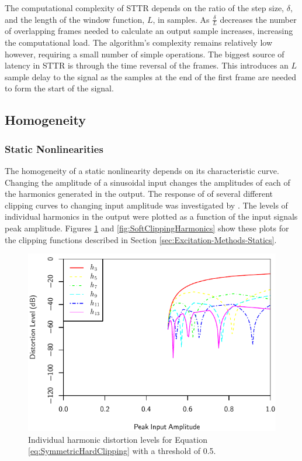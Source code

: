 		The computational complexity of STTR depends on the ratio of the step size, $\delta$, and the length of the
		window function, $L$, in samples. As $\frac{\delta}{L}$ decreases the number of overlapping frames needed
		to calculate an output sample increases, increasing the computational load. The algorithm's complexity
		remains relatively low however, requiring a small number of simple operations. The biggest source of
		latency in STTR is through the time reversal of the frames. This introduces an $L$ sample delay to the
		signal as the samples at the end of the first frame are needed to form the start of the signal.

	\subsection{Homogeneity}
	\label{sec:ExcitationEvaluation-Comparison-Homogeneity}

		\subsubsection*{Static Nonlinearities}
			The homogeneity of a static nonlinearity depends on its characteristic curve. Changing the
			amplitude of a sinusoidal input changes the amplitudes of each of the harmonics generated in the
			output. The response of of several different clipping curves to changing input amplitude was
			investigated by \citet{enderby2012harmonic}. The levels of individual harmonics in the output were
			plotted as a function of the input signals peak amplitude. Figures \ref{fig:HardClippingHarmonics}
			and \ref{fig:SoftClippingHarmonics} show these plots for the clipping functions described in
			Section \ref{sec:Excitation-Methods-Statics}.

			\begin{figure}[h!]
				\centering
				\includegraphics{chapter5/Images/HardClippingHarmonics.pdf}
				\caption{Individual harmonic distortion levels for Equation \ref{eq:SymmetricHardClipping}
					 with a threshold of 0.5.}
				\label{fig:HardClippingHarmonics}
			\end{figure}

